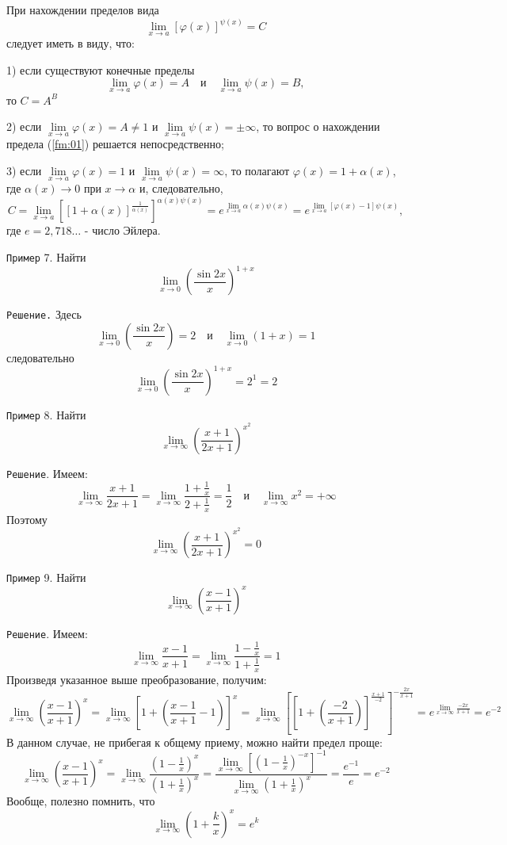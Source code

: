 \documentclass[12pt]{article}
\begin{document}
	
	При нахождении пределов вида 
	\[
		\lim\limits_{x\to a}[\varphi(x)]^{\psi(x)}=C
	\tag{1}\label{fm:01}
	\]
	следует иметь в виду, что:
	
	1) если существуют конечные пределы
	\[
		\lim\limits_{x\to a}\varphi(x)=A\quad\text{и}\quad\lim\limits_{x\to a}\psi(x) = B,
	\]
	то $C=A^B$
	
	2) если $\lim\limits_{x\to a}\varphi(x) = A\neq1$ и $\lim\limits_{x\to a}\psi(x) = \pm \infty$, то вопрос о нахождении предела (\ref{fm:01}) решается непосредственно;
	
	3) если $\lim\limits_{x\to a}\varphi(x)=1$ и $\lim\limits_{x\to a}\psi(x)=\infty$, то полагают $\varphi(x)=1+\alpha(x)$, где $\alpha(x)\to0$ при $x\to \alpha$ и, следовательно,
	\[
		C=\lim\limits_{x\to a}[[1+\alpha(x)]^{\frac{1}{\alpha(x)}}]^{\alpha(x)\psi(x)} = e^{\lim\limits_{x\to a}\alpha(x)\psi(x)} = e^{\lim\limits_{x\to a}[\varphi(x)-1]\psi(x)},
		\tag{2}\label{fm:02}
	\]
	где $e=2,718\dots$ - число Эйлера.
	
	{\tt Пример} 7. Найти
	\[
		\lim\limits_{x\to 0}\left(\dfrac{\sin 2x}{x}\right)^{1+x}
	\]
	
	{\tt Решение.} Здесь
	\[
		\lim\limits_{x\to 0}\left(\dfrac{\sin 2x}{x}\right) = 2\quad\text{и}\quad \lim\limits_{x\to 0}(1+x)=1
	\]
	следовательно
	\[
		\lim\limits_{x\to 0}\left(\dfrac{\sin 2x}{x}\right)^{1+x} = 2^1=2
	\]
	
	{\tt Пример} 8. Найти
	\[
		\lim\limits_{x\to \infty}\left(\dfrac{x+1}{2x+1}\right)^{x^2}
	\]
	
	{\tt Решение}. Имеем:
	\[
		\lim\limits_{x\to \infty}\dfrac{x+1}{2x+1} = \lim\limits_{x\to\infty}\dfrac{1+\frac{1}{x}}{2+\frac{1}{x}} = \dfrac{1}{2}\quad\text{и}\quad\lim\limits_{x\to\infty}x^2=+\infty
	\]
	Поэтому
	\[
		\lim\limits_{x\to\infty}\left(\dfrac{x+1}{2x+1}\right)^{x^2} = 0
	\]
	
	{\tt Пример} 9. Найти
	\[
		\lim\limits_{x\to\infty}\left(\dfrac{x-1}{x+1}\right)^x
	\]
	
	{\tt Решение}. Имеем:
	\[
		\lim\limits_{x\to\infty}\dfrac{x-1}{x+1} = \lim\limits_{x\to\infty}\dfrac{1-\frac{1}{x}}{1+\frac{1}{x}}=1
	\]
	Произведя указанное выше преобразование, получим:
	\[
		\lim\limits_{x\to\infty}\left(\dfrac{x-1}{x+1}\right)^x = \lim\limits_{x\to\infty}\left[1+\left(\dfrac{x-1}{x+1}-1\right)\right]^x = \lim\limits_{x\to\infty}\left[\left[1+\left(\dfrac{-2}{x+1}\right)\right]^{\frac{x+1}{-2}}\right]^{-\frac{2x}{x+1}} = e^{\lim\limits_{x\to\infty}\frac{-2x}{x+1}} = e^{-2}
	\]
	В данном случае, не прибегая к общему приему, можно найти предел проще:
	\[
		\lim\limits_{x\to\infty}\left(\dfrac{x-1}{x+1}\right)^x = \lim\limits_{x\to\infty} \dfrac{\left(1-\frac{1}{x}\right)^x}{\left(1+\frac{1}{x}\right)^x} = \dfrac{\lim\limits_{x\to\infty}\left[\left(1-\frac{1}{x}\right)^{-x}\right]^{-1}}{\lim\limits_{x\to\infty}\left(1+\frac{1}{x}\right)^x} = \dfrac{e^{-1}}{e} = e^{-2}
	\]
	Вообще, полезно помнить, что
	\[
		\lim\limits_{x\to\infty}\left(1+\frac{k}{x}\right)^x = e^k\tag{3}\label{fm:03}
	\]
	
\end{document}
